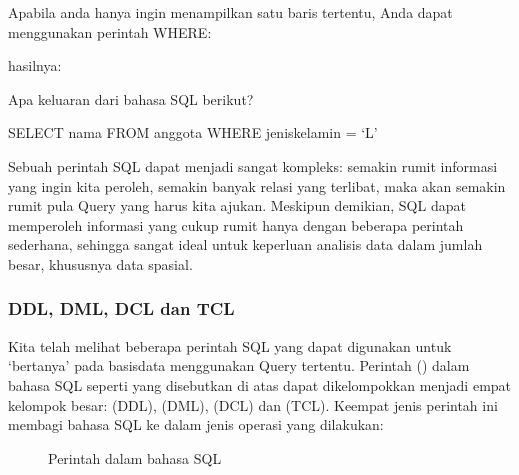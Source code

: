 \documentclass[letterpaper,10pt,english]{sphinxmanual}
\let\sphinxpxdimen\pdfpxdimen\else\newdimen\sphinxpxdimen
\begin{document}

Apabila anda hanya ingin menampilkan satu baris tertentu, Anda dapat menggunakan perintah WHERE:

\begin{sphinxVerbatim}[commandchars=\\\{\}]
       
\end{sphinxVerbatim}

hasilnya:


Apa keluaran dari bahasa SQL berikut?

\begin{sphinxVerbatim}[commandchars=\\\{\}]
SELECT nama FROM anggota WHERE jenis\PYGZus{}kelamin = ‘L’
\end{sphinxVerbatim}

Sebuah perintah SQL dapat menjadi sangat kompleks: semakin rumit informasi yang ingin kita peroleh, semakin banyak relasi yang terlibat, maka akan semakin rumit pula Query yang harus kita ajukan. Meskipun demikian, SQL dapat memperoleh informasi yang cukup rumit hanya dengan beberapa perintah sederhana, sehingga sangat ideal untuk keperluan analisis data dalam jumlah besar, khususnya data spasial.


\subsubsection{DDL, DML, DCL dan TCL}
\label{\detokenize{sesi2/relationaldb:ddl-dml-dcl-dan-tcl}}
Kita telah melihat beberapa perintah SQL yang dapat digunakan untuk ‘bertanya’ pada basisdata menggunakan Query tertentu. Perintah () dalam bahasa SQL seperti yang disebutkan di atas dapat dikelompokkan menjadi empat kelompok besar:  (DDL),  (DML),  (DCL) dan  (TCL). Keempat jenis perintah ini membagi bahasa SQL ke dalam jenis operasi yang dilakukan:

\begin{figure}[htbp]
\centering
\capstart

\noindent\sphinxincludegraphics[height=300\sphinxpxdimen]{{2020-12-08-00-54-04}.png}
\caption{Perintah dalam bahasa SQL}\label{\detokenize{sesi2/relationaldb:ddl}}\end{figure}
\end{document}
